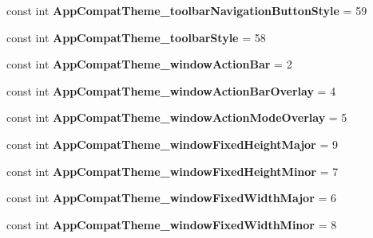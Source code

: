 \begin{DoxyCompactItemize}
const int {\bfseries App\+Compat\+Theme\+\_\+toolbar\+Navigation\+Button\+Style} = 59
\item 
\mbox{\label{classXaria_1_1Resource_1_1Styleable_a272e8097549a19d79b956bacd467e685}} 
const int {\bfseries App\+Compat\+Theme\+\_\+toolbar\+Style} = 58
\item 
\mbox{\label{classXaria_1_1Resource_1_1Styleable_aad3810ae161739f9f65c8a0419cf0cb8}} 
const int {\bfseries App\+Compat\+Theme\+\_\+window\+Action\+Bar} = 2
\item 
\mbox{\label{classXaria_1_1Resource_1_1Styleable_a7be84d3934823c28ae310757632238ae}} 
const int {\bfseries App\+Compat\+Theme\+\_\+window\+Action\+Bar\+Overlay} = 4
\item 
\mbox{\label{classXaria_1_1Resource_1_1Styleable_a7c112816ffbfb9fa7bb1c79105b96e9a}} 
const int {\bfseries App\+Compat\+Theme\+\_\+window\+Action\+Mode\+Overlay} = 5
\item 
\mbox{\label{classXaria_1_1Resource_1_1Styleable_a037085f3b9de7bd335666b3ba7b84ad2}} 
const int {\bfseries App\+Compat\+Theme\+\_\+window\+Fixed\+Height\+Major} = 9
\item 
\mbox{\label{classXaria_1_1Resource_1_1Styleable_a14a33f0cd51bf1fdb0201bedee74cd81}} 
const int {\bfseries App\+Compat\+Theme\+\_\+window\+Fixed\+Height\+Minor} = 7
\item 
\mbox{\label{classXaria_1_1Resource_1_1Styleable_a62114db0b72c340c774564c507a4769b}} 
const int {\bfseries App\+Compat\+Theme\+\_\+window\+Fixed\+Width\+Major} = 6
\item 
\mbox{\label{classXaria_1_1Resource_1_1Styleable_a803aa9d2b5f73f2429e9aac7735533eb}} 
const int {\bfseries App\+Compat\+Theme\+\_\+window\+Fixed\+Width\+Minor} = 8
\item 
\mbox{\label{classXaria_1_1Resource_1_1Styleable_acc0ab80973214382ebcc3ed63d74dc26}} 

\end{DoxyCompactItemize}
